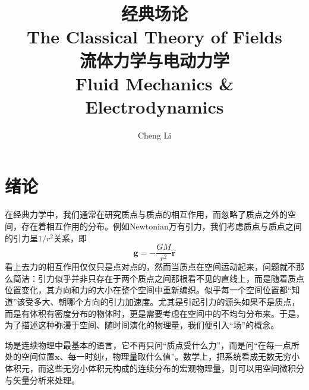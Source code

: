 \documentclass[b5paper]{book}
\author{Cheng Li}
\title{\textbf{{\Huge 经典场论}\\{\Huge The Classical Theory of Fields}}\\\normalsize 流体力学与电动力学\\Fluid Mechanics \& Electrodynamics}
\begin{document}
\maketitle
\tableofcontents


\chapter*{绪论}
在经典力学中，我们通常在研究质点与质点的相互作用，而忽略了质点之外的空间，存在着相互作用的分布。例如Newtonian万有引力，我们考虑质点与质点之间的引力呈$1/r^2$关系，即
\begin{equation}
    \boldsymbol{g} = -\frac{GM}{r^2}\hat{\boldsymbol{r}}
\end{equation}
看上去力的相互作用仅仅只是点对点的，然而当质点在空间运动起来，问题就不那么简洁：引力似乎并非只存在于两个质点之间那根看不见的直线上，而是随着质点位置变化，其方向和力的大小在整个空间中重新编织。似乎每一个空间位置都“知道”该受多大、朝哪个方向的引力加速度。尤其是引起引力的源头如果不是质点，而是有体积有密度分布的物体时，更是需要考虑在空间中的不均匀分布来。于是，为了描述这种弥漫于空间、随时间演化的物理量，我们便引入“场”的概念。

场是连续物理中最基本的语言，它不再只问“质点受什么力”，而是问“在每一点所处的空间位置$\boldsymbol{x}$、每一时刻$t$，物理量取什么值”。数学上，把系统看成无数无穷小体积元，而这些无穷小体积元构成的连续分布的宏观物理量，则可以用空间微积分与矢量分析来处理。
\end{document}
